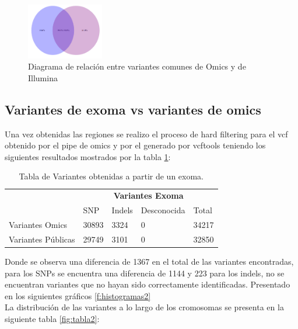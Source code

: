 \begin{figure}[H]
	\centering
	\includegraphics[width=0.3\textwidth]{Kap2/diagrama1}
	\caption{Diagrama de relación entre variantes comunes de Omics y de Illumina} \label{fig:diagrama}
\end{figure}

\subsection*{Variantes de exoma vs variantes de omics}

Una vez obtenidas las regiones se realizo el proceso de hard filtering para el vcf obtenido por el pipe de omics y por el generado por vcftools teniendo los siguientes resultados mostrados por la tabla \ref{tabla:tabla2}: \\

\begin{table}[H]
	\centering  
	\begin{tabular}{|l|l|l|l|l|}
		\hline
		& \multicolumn{4}{c|}{\textbf{Variantes Exoma}} \\
		\cline{2-5} 
		& SNP  & Indels & Desconocida & Total \\ \cline{2-5}
		\hline 
		\multirow{1}{4cm}{Variantes Omics} & 30893 & 3324 & 0 & 34217 \\ \cline{2-5}
		\hline 
		\multirow{1}{4cm}{Variantes Públicas} & 29749 & 3101 & 0 & 32850 \\ \cline{2-5}
		\hline
	\end{tabular}
	\caption{Tabla de Variantes obtenidas a partir de un exoma.}
	\label{tabla:tabla2}
\end{table} 

Donde se observa una diferencia de 1367 en el total de las variantes encontradas, para los SNPs se encuentra una diferencia de 1144 y 223 para los indels, no se encuentran variantes que no hayan sido correctamente identificadas. Presentado en los siguientes gráficos \ref{f:histogramas2} \\

La distribución de las variantes a lo largo de los cromosomas se presenta en la siguiente tabla \ref{fig:tabla2}:

